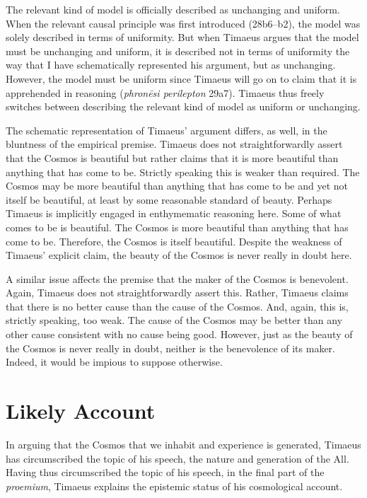 The relevant kind of model is officially described as unchanging and uniform. When the relevant causal principle was first introduced (28b6--b2), the model was solely described in terms of uniformity. But when Timaeus argues that the model must be unchanging and uniform, it is described not in terms of uniformity the way that I have schematically represented his argument, but as unchanging. However, the model must be uniform since Timaeus will go on to claim that it is apprehended in reasoning (\emph{phronēsi perilepton} 29a7). Timaeus thus freely switches between describing the relevant kind of model as uniform or unchanging.

The schematic representation of Timaeus' argument differs, as well, in the bluntness of the empirical premise. Timaeus does not straightforwardly assert that the Cosmos is beautiful but rather claims that it is more beautiful than anything that has come to be. Strictly speaking this is weaker than required. The Cosmos may be more beautiful than anything that has come to be and yet not itself be beautiful, at least by some reasonable standard of beauty. Perhaps Timaeus is implicitly engaged in enthymematic reasoning here. Some of what comes to be is beautiful. The Cosmos is more beautiful than anything that has come to be. Therefore, the Cosmos is itself beautiful. Despite the weakness of Timaeus' explicit claim, the beauty of the Cosmos is never really in doubt here. 

A similar issue affects the premise that the maker of the Cosmos is benevolent. Again, Timaeus does not straightforwardly assert this. Rather, Timaeus claims that there is no better cause than the cause of the Cosmos. And, again, this is, strictly speaking, too weak. The cause of the Cosmos may be better than any other cause consistent with no cause being good. However, just as the beauty of the Cosmos is never really in doubt, neither is the benevolence of its maker. Indeed, it would be impious to suppose otherwise.


\section{Likely Account} %
\label{sec:likely_account}

In arguing that the Cosmos that we inhabit and experience is generated, Timae\-us has circumscribed the topic of his speech, the nature and generation of the All. Having thus circumscribed the topic of his speech, in the final part of the \emph{proemium}, Timaeus explains the epistemic status of his cosmological account.

